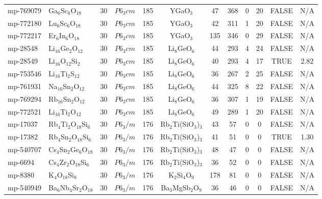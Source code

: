 {\begin{longtable}{llcccccccccc}
    mp-769079 & Ga$_{6}$Sc$_{6}$O$_{18}$ & 30    & $P6_3cm$ & 185   & YGaO$_{3}$ & 47    & 368   & 0     & 20    & FALSE & N/A \\
    mp-772180 & Lu$_{6}$Sc$_{6}$O$_{18}$ & 30    & $P6_3cm$ & 185   & YGaO$_{3}$ & 42    & 311   & 1     & 20    & FALSE & N/A \\
    mp-772217 & Er$_{6}$In$_{6}$O$_{18}$ & 30    & $P6_3cm$ & 185   & YGaO$_{3}$ & 135   & 346   & 0     & 29    & FALSE & N/A \\
    mp-28548 & Li$_{16}$Ge$_{2}$O$_{12}$ & 30    & $P6_3cm$ & 185   & Li$_{8}$GeO$_{6}$ & 44    & 293   & 4     & 24    & FALSE & N/A \\
    mp-28549 & Li$_{16}$O$_{12}$Si$_{2}$ & 30    & $P6_3cm$ & 185   & Li$_{8}$GeO$_{6}$ & 40    & 293   & 4     & 17    & TRUE  & 2.82  \\
    mp-753546 & Li$_{16}$Ti$_{2}$S$_{12}$ & 30    & $P6_3cm$ & 185   & Li$_{8}$GeO$_{6}$ & 36    & 267   & 2     & 25    & FALSE & N/A \\
    mp-761931 & Na$_{16}$Sn$_{2}$O$_{12}$ & 30    & $P6_3cm$ & 185   & Li$_{8}$GeO$_{6}$ & 44    & 325   & 8     & 22    & FALSE & N/A \\
    mp-769294 & Rb$_{16}$Sn$_{2}$O$_{12}$ & 30    & $P6_3cm$ & 185   & Li$_{8}$GeO$_{6}$ & 36    & 307   & 1     & 19    & FALSE & N/A \\
    mp-772521 & Li$_{16}$Ti$_{2}$O$_{12}$ & 30    & $P6_3cm$ & 185   & Li$_{8}$GeO$_{6}$ & 49    & 289   & 1     & 20    & FALSE & N/A \\
    mp-17037 & Rb$_{4}$Ti$_{2}$O$_{18}$Si$_{6}$ & 30    & $P6_3/m$ & 176   & Rb$_{2}$Ti(SiO$_{3}$)$_{3}$ & 43    & 57    & 0     & 0     & FALSE & N/A \\
    mp-17382 & Rb$_{4}$Sn$_{2}$O$_{18}$Si$_{6}$ & 30    & $P6_3/m$ & 176   & Rb$_{2}$Ti(SiO$_{3}$)$_{3}$ & 41    & 51    & 0     & 0     & TRUE  & 1.30  \\
    mp-540707 & Cs$_{4}$Sn$_{2}$Ge$_{6}$O$_{18}$ & 30    & $P6_3/m$ & 176   & Rb$_{2}$Ti(SiO$_{3}$)$_{3}$ & 48    & 47    & 0     & 0     & FALSE & N/A \\
    mp-6694 & Cs$_{4}$Zr$_{2}$O$_{18}$Si$_{6}$ & 30    & $P6_3/m$ & 176   & Rb$_{2}$Ti(SiO$_{3}$)$_{3}$ & 36    & 52    & 0     & 0     & FALSE & N/A \\
    mp-8380 & K$_{4}$O$_{18}$Si$_{8}$ & 30    & $P6_3/m$ & 176   & K$_{2}$Si$_{4}$O$_{9}$ & 178   & 81    & 0     & 0     & FALSE & N/A \\
    mp-540949 & Ba$_{6}$Nb$_{4}$Sr$_{2}$O$_{18}$ & 30    & $P6_3/m$ & 176   & Ba$_{3}$MgSb$_{2}$O$_{9}$ & 36    & 46    & 0     & 0     & FALSE & N/A \\

\end{longtable}}
